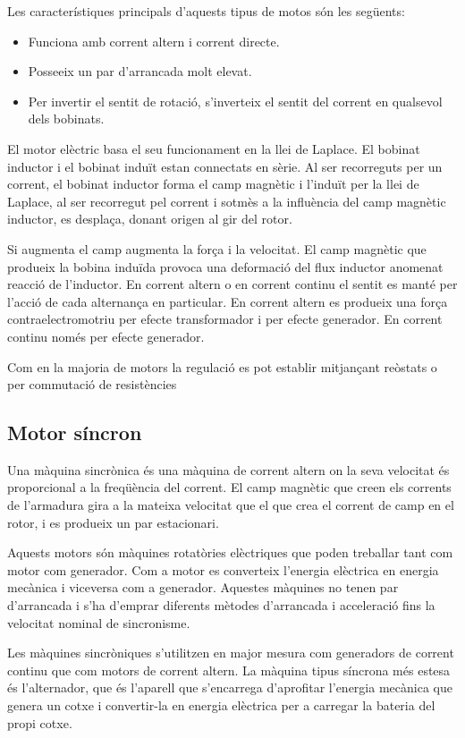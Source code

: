 Les característiques principals d'aquests tipus de motos són les següents:
\begin{itemize}
    \item Funciona amb corrent altern i corrent directe.
    \item Posseeix un par d'arrancada molt elevat.
    \item Per invertir el sentit de rotació, s'inverteix el sentit del corrent en qualsevol dels bobinats.
\end{itemize}

El motor elèctric basa el seu funcionament en la llei de Laplace. El bobinat inductor i el bobinat induït estan connectats en sèrie. Al ser recorreguts per un corrent, el bobinat inductor forma el camp magnètic i l'induït per la llei de Laplace, al ser recorregut pel corrent i sotmès a la influència del camp magnètic inductor, es desplaça, donant origen al gir del rotor.

Si augmenta el camp augmenta la força i la velocitat. El camp magnètic que produeix la bobina induïda provoca una deformació del flux inductor anomenat reacció de l'inductor. En corrent altern o en corrent continu el sentit es manté per l'acció de cada alternança en particular. En corrent altern es produeix una força contraelectromotriu per efecte transformador i per efecte generador. En corrent continu només per efecte generador.

Com en la majoria de motors la regulació es pot establir mitjançant reòstats o per commutació de resistències

\subsection{Motor síncron}
Una màquina sincrònica és una màquina de corrent altern on la seva velocitat és proporcional a la freqüència del corrent. El camp magnètic que creen els corrents de l'armadura gira a la mateixa velocitat que el que crea el corrent de camp en el rotor, i es produeix un par estacionari.

Aquests motors són màquines rotatòries elèctriques que poden treballar tant com motor com generador. Com a motor es converteix l'energia \newline elèctrica en energia mecànica i viceversa com a generador. Aquestes \newline màquines no tenen par d'arrancada i s'ha d'emprar diferents mètodes d'arrancada i acceleració fins la velocitat nominal de sincronisme.

Les màquines sincròniques s'utilitzen en major mesura com generadors de corrent continu que com motors de corrent altern. La màquina tipus síncrona més estesa és l'alternador, que és l'aparell que s'encarrega \newline d'aprofitar l'energia mecànica que genera un cotxe i convertir-la en energia elèctrica per a carregar la bateria del propi cotxe.

